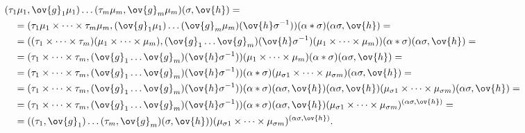 \begin{align*}


&(\t_1\mu_1,\ov{g}_1\mu_1) \dotsc (\t_m\mu_m,\ov{g}_m\mu_m)(\s,\ov{h})=\\


%


&\quad=(\t_1\mu_1 \times \dotsb \times \t_m\mu_m,


(\ov{g}_1\mu_1) \dotsc (\ov{g}_m\mu_m) (\ov{h}\s^{-1}))


(\al * \s)(\al\s,\ov{h})= \\


%


&\quad=((\t_1 \times \dotsb \times \t_m) (\mu_1 \times \dotsb \times \mu_m),


(\ov{g}_1 \dotsc \ov{g}_m)(\ov{h}\s^{-1}) (\mu_1 \times \dotsb \times \mu_m))


(\al * \s)(\al\s,\ov{h})=\\


%


&\quad=(\t_1 \times \dotsb \times \t_m,


(\ov{g}_1 \dotsc \ov{g}_m)(\ov{h}\s^{-1}))


(\mu_1 \times \dotsb \times \mu_m)(\al * \s)(\al\s,\ov{h})=\\


%


&\quad=(\t_1 \times \dotsb \times \t_m,


(\ov{g}_1 \dotsc \ov{g}_m)(\ov{h}\s^{-1}))


(\al * \s)(\mu_{\s1} \times \dotsb \times \mu_{\s{m}})(\al\s,\ov{h})= \\


%


&\quad=(\t_1 \times \dotsb \times \t_m,


(\ov{g}_1 \dotsc \ov{g}_m)(\ov{h}\s^{-1}))


(\al * \s)(\al\s,\ov{h})(\al\s,\ov{h})


(\mu_{\s1} \times \dotsb \times \mu_{\s{m}})(\al\s,\ov{h})= \\


%


&\quad=(\t_1 \times \dotsb \times \t_m,


(\ov{g}_1 \dotsc \ov{g}_m)(\ov{h}\s^{-1}))


(\al * \s)(\al\s,\ov{h})


(\mu_{\s1} \times \dotsb \times \mu_{\s{m}})^{(\al\s,\ov{h})}= \\


%


&\quad=((\t_1,\ov{g}_1) \dotsc (\t_m,\ov{g}_m) (\s,\ov{h}))


(\mu_{\s1} \times \dotsb \times \mu_{\s{m}})^{(\al\s,\ov{h})}.


\end{align*}


